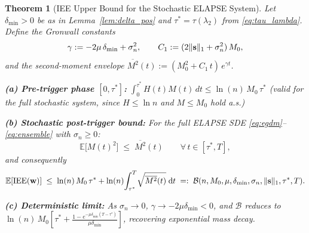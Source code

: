 \documentclass[review,12pt]{elsarticle}
\newcommand{\bfw}{\mathbf{w}}
\newcommand{\IEE}{\mathrm{IEE}}
\newcommand{\lambdat}{\lambda_2}
\newtheorem{theorem}{Theorem}
\begin{document}
\begin{theorem}[IEE Upper Bound for the Stochastic ELAPSE System]
\label{thm:iee_bound}
Let $\delta_{\min} > 0$ be as in Lemma~\ref{lem:delta_pos} and
$\tau^* = \tau(\lambdat)$ from \eqref{eq:tau_lambda}.
Define the Gronwall constants
\begin{equation}
  \gamma := -2\mu\,\delta_{\min} + \sigma_n^2,
  \qquad
  C_1 := (2\|{\bf s}\|_1 + \sigma_n^2)\,M_0,
  \label{eq:gronwall_constants}
\end{equation}
and the second-moment envelope
$\overline{M^2}(t) := (M_0^2 + C_1\,t)\,e^{\gamma t}$.

\medskip
\noindent\textbf{(a) Pre-trigger phase $[0, \tau^*]$:}
$\displaystyle\int_0^{\tau^*} H(t)M(t)\,dt \leq \ln(n)\,M_0\,\tau^*$
(valid for the full stochastic system, since $H \leq \ln n$ and $M \leq M_0$
hold a.s.)

\medskip
\noindent\textbf{(b) Stochastic post-trigger bound:}
For the full ELAPSE SDE \eqref{eq:egdm}--\eqref{eq:ensemble} with $\sigma_n \geq 0$:
\begin{equation}
  \mathbb{E}\bigl[M(t)^2\bigr] \;\leq\; \overline{M^2}(t)
  \qquad\forall\, t \in [\tau^*, T],
  \label{eq:E_M2_bound}
\end{equation}
and consequently
\begin{equation}
  \mathbb{E}[\IEE(\bfw)] \;\leq\;
  \ln(n)\,M_0\,\tau^*
  + \ln(n)\!\int_{\tau^*}^{T} \!\sqrt{\overline{M^2}(t)}\;\mathrm{d}t
  \;=:\; \mathcal{B}(n,M_0,\mu,\delta_{\min},\sigma_n,\|{\bf s}\|_1,\tau^*,T).
  \label{eq:iee_bound_stochastic}
\end{equation}

\medskip
\noindent\textbf{(c) Deterministic limit:}
As $\sigma_n \to 0$, $\gamma \to -2\mu\delta_{\min} < 0$, and
$\mathcal{B}$ reduces to
$\ln(n)\,M_0\!\left[\tau^* + \frac{1-e^{-\mu\delta_{\min}(T-\tau^*)}}{\mu\delta_{\min}}\right]$,
recovering exponential mass decay.
\end{theorem}
\end{document}
